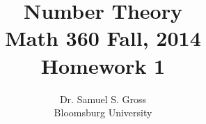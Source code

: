 \documentclass{article}
\begin{document}
  
\usepackage{setspace}
   

\newtheorem{theorem}{Theorem}
\theoremstyle{definition} 
\newtheorem{problem}[theorem]{Problem}

    
\newenvironment{solution}[1][Solution]{\begin{doublespace}\textbf{#1.}\quad }{\ \rule{0.5em}{0.5em}\end{doublespace}}
    
\title{Number Theory\\
Math 360 Fall, 2014\\
Homework 1}
\author{Dr. Samuel S. Gross \\
Bloomsburg University}
\end{document}

